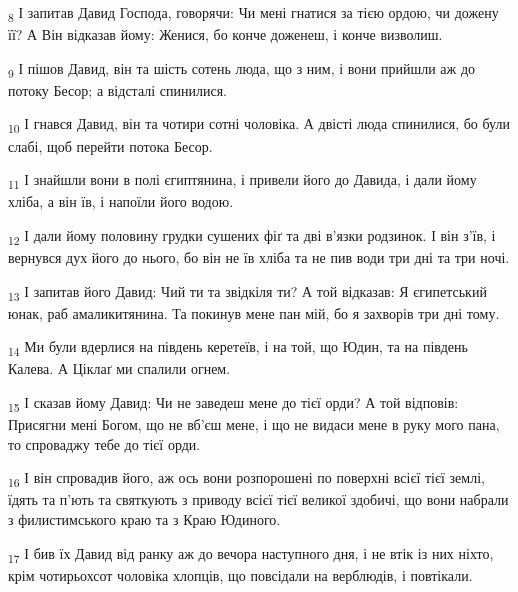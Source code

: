 \begin{tcolorbox}
\textsubscript{8} І запитав Давид Господа, говорячи: Чи мені гнатися за тією ордою, чи дожену її? А Він відказав йому: Женися, бо конче доженеш, і конче визволиш.
\end{tcolorbox}
\begin{tcolorbox}
\textsubscript{9} І пішов Давид, він та шість сотень люда, що з ним, і вони прийшли аж до потоку Бесор; а відсталі спинилися.
\end{tcolorbox}
\begin{tcolorbox}
\textsubscript{10} І гнався Давид, він та чотири сотні чоловіка. А двісті люда спинилися, бо були слабі, щоб перейти потока Бесор.
\end{tcolorbox}
\begin{tcolorbox}
\textsubscript{11} І знайшли вони в полі єгиптянина, і привели його до Давида, і дали йому хліба, а він їв, і напоїли його водою.
\end{tcolorbox}
\begin{tcolorbox}
\textsubscript{12} І дали йому половину грудки сушених фіґ та дві в'язки родзинок. І він з'їв, і вернувся дух його до нього, бо він не їв хліба та не пив води три дні та три ночі.
\end{tcolorbox}
\begin{tcolorbox}
\textsubscript{13} І запитав його Давид: Чий ти та звідкіля ти? А той відказав: Я єгипетський юнак, раб амаликитянина. Та покинув мене пан мій, бо я захворів три дні тому.
\end{tcolorbox}
\begin{tcolorbox}
\textsubscript{14} Ми були вдерлися на південь керетеїв, і на той, що Юдин, та на південь Калева. А Ціклаґ ми спалили огнем.
\end{tcolorbox}
\begin{tcolorbox}
\textsubscript{15} І сказав йому Давид: Чи не заведеш мене до тієї орди? А той відповів: Присягни мені Богом, що не вб'єш мене, і що не видаси мене в руку мого пана, то спроваджу тебе до тієї орди.
\end{tcolorbox}
\begin{tcolorbox}
\textsubscript{16} І він спровадив його, аж ось вони розпорошені по поверхні всієї тієї землі, їдять та п'ють та святкують з приводу всієї тієї великої здобичі, що вони набрали з филистимського краю та з Краю Юдиного.
\end{tcolorbox}
\begin{tcolorbox}
\textsubscript{17} І бив їх Давид від ранку аж до вечора наступного дня, і не втік із них ніхто, крім чотирьохсот чоловіка хлопців, що повсідали на верблюдів, і повтікали.
\end{tcolorbox}
